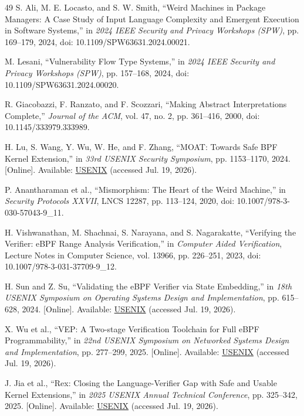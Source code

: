 \documentclass[conference]{IEEEtran}
\begin{document}
\begin{thebibliography}{49}
S. Ali, M. E. Locasto, and S. W. Smith, ``Weird Machines in Package Managers: A Case Study of Input Language Complexity and Emergent Execution in Software Systems,'' in \emph{2024 IEEE Security and Privacy Workshops (SPW)}, pp. 169--179, 2024, doi: 10.1109/SPW63631.2024.00021.

M. Lesani, ``Vulnerability Flow Type Systems,'' in \emph{2024 IEEE Security and Privacy Workshops (SPW)}, pp. 157--168, 2024, doi: 10.1109/SPW63631.2024.00020.

R. Giacobazzi, F. Ranzato, and F. Scozzari, ``Making Abstract Interpretations Complete,'' \emph{Journal of the ACM}, vol. 47, no. 2, pp. 361--416, 2000, doi: 10.1145/333979.333989.

H. Lu, S. Wang, Y. Wu, W. He, and F. Zhang, ``MOAT: Towards Safe BPF Kernel Extension,'' in \emph{33rd USENIX Security Symposium}, pp. 1153--1170, 2024. [Online]. Available: \href{https://www.usenix.org/conference/usenixsecurity24/presentation/lu-hongyi}{USENIX} (accessed Jul. 19, 2026).

P. Anantharaman et al., ``Mismorphism: The Heart of the Weird Machine,'' in \emph{Security Protocols XXVII}, LNCS 12287, pp. 113--124, 2020, doi: 10.1007/978-3-030-57043-9\_11.

H. Vishwanathan, M. Shachnai, S. Narayana, and S. Nagarakatte, ``Verifying the Verifier: eBPF Range Analysis Verification,'' in \emph{Computer Aided Verification}, Lecture Notes in Computer Science, vol. 13966, pp. 226--251, 2023, doi: 10.1007/978-3-031-37709-9\_12.

H. Sun and Z. Su, ``Validating the eBPF Verifier via State Embedding,'' in \emph{18th USENIX Symposium on Operating Systems Design and Implementation}, pp. 615--628, 2024. [Online]. Available: \href{https://www.usenix.org/conference/osdi24/presentation/sun-hao}{USENIX} (accessed Jul. 19, 2026).

X. Wu et al., ``VEP: A Two-stage Verification Toolchain for Full eBPF Programmability,'' in \emph{22nd USENIX Symposium on Networked Systems Design and Implementation}, pp. 277--299, 2025. [Online]. Available: \href{https://www.usenix.org/conference/nsdi25/presentation/wu-xiwei}{USENIX} (accessed Jul. 19, 2026).

J. Jia et al., ``Rex: Closing the Language-Verifier Gap with Safe and Usable Kernel Extensions,'' in \emph{2025 USENIX Annual Technical Conference}, pp. 325--342, 2025. [Online]. Available: \href{https://www.usenix.org/conference/atc25/presentation/jia}{USENIX} (accessed Jul. 19, 2026).


\end{thebibliography}
\end{document}
